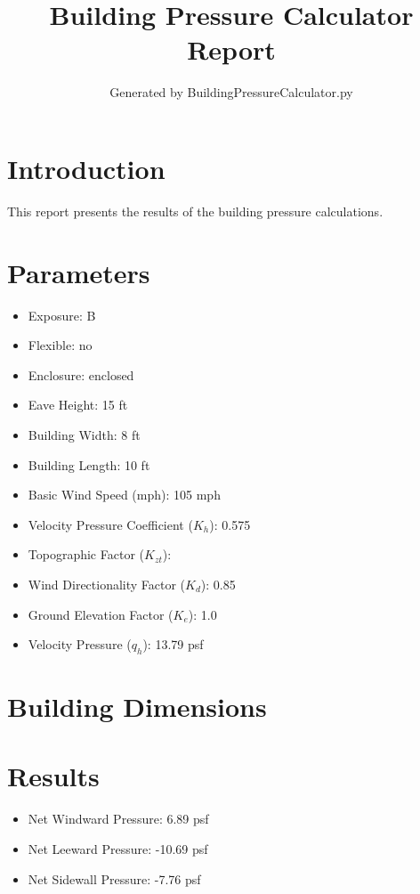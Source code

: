 \documentclass{article}
\title{Building Pressure Calculator Report}
\author{Generated by BuildingPressureCalculator.py}
\begin{document}
\maketitle

\section{Introduction}
This report presents the results of the building pressure calculations.

\section{Parameters}
\begin{itemize}
    \item Exposure: B
    \item Flexible: no
    \item Enclosure: enclosed
    \item Eave Height: 15 ft
    \item Building Width: 8 ft
    \item Building Length: 10 ft
    \item Basic Wind Speed (mph): 105 mph
    \item Velocity Pressure Coefficient ($K_h$): 0.575
    \item Topographic Factor ($K_{zt}$): 
    \item Wind Directionality Factor ($K_d$): 0.85
    \item Ground Elevation Factor ($K_e$): 1.0
    \item Velocity Pressure ($q_h$): 13.79 psf
\end{itemize}

\section{Building Dimensions}

\section{Results}
\begin{itemize}
    \item Net Windward Pressure: 6.89 psf
    \item Net Leeward Pressure: -10.69 psf
    \item Net Sidewall Pressure: -7.76 psf
\end{itemize}
\end{document}
